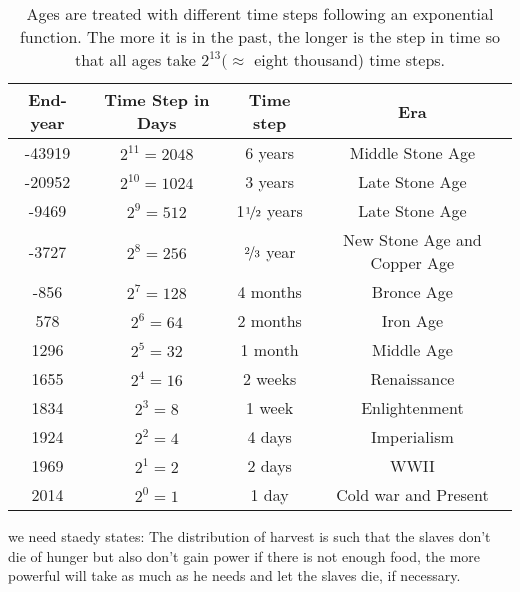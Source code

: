 \documentclass[12pt]{article}
\begin{document}
\begin{table} [ht]
  \centering
\begin{tabular}{ c c c c }
\hline  
  End-year & Time Step in Days & Time step & Era \\
\hline  
   -43919  & $2^{11} = 2048$ &  6 years & Middle Stone Age \\ 
   -20952  & $2^{10} = 1024$ &  3 years & Late Stone Age \\ %
    -9469  & $2^9 = 512$ &  1$\nicefrac{1}{2}$ years & Late Stone Age \\ %
    -3727  & $2^8 = 256$ &  $\nicefrac{2}{3}$ year & New Stone Age and Copper Age \\ %
     -856  & $2^7 = 128$ &  4 months & Bronce Age \\ 
      578  & $2^6 = 64$ &  2 months & Iron Age \\ %
     1296  & $2^5 = 32$ &  1 month & Middle Age \\ %
     1655  & $2^4 = 16$ &  2 weeks & Renaissance \\ %
     1834  & $2^3 = 8$ &  1 week & Enlightenment \\ 
     1924  & $2^2 = 4$ &  4 days & Imperialism \\ %
     1969  & $2^1 = 2$ &  2 days & WWII \\ 
     2014  & $2^0 = 1$ &  1 day & Cold war and Present \\ 
\hline 
\end{tabular} 
  \label{tab:time_steps_for_ages}
  \caption{Ages are treated with different time steps following an exponential function.
  The more it is in the past, the longer is the step in time 
  so that all ages take $2^{13} (\approx$ eight thousand) time steps.} 
\end{table}



we need staedy states:
The distribution of harvest is such that the slaves don't die of hunger but also don't gain power
if there is not enough food, the more powerful will take as much as he
needs and let the slaves die, if necessary.
\end{document}
